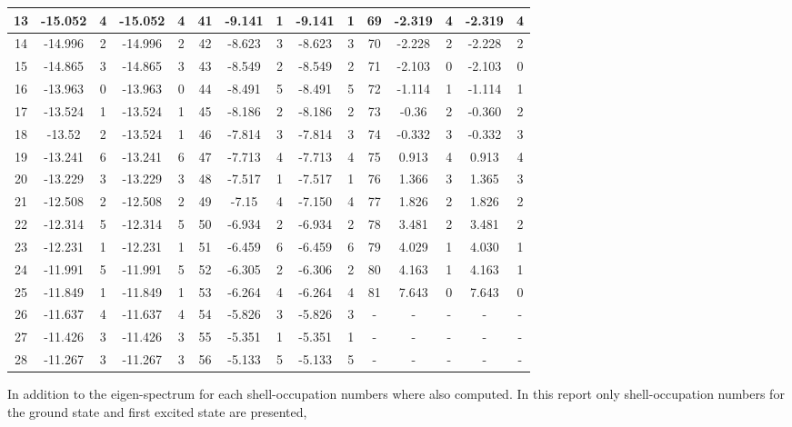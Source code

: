 \begin{table}[h]
\begin{tabular}{|c|c|c|c|c||c|c|c|c|c||c|c|c|c|c|}
\hline 13  & -15.052 &       4 & -15.052 & 4 & 41  &  -9.141 &       1 & -9.141 & 1 & 69  &  -2.319 &       4 & -2.319 & 4 \\
\hline 14  & -14.996 &       2 & -14.996 & 2 & 42  &  -8.623 &       3 & -8.623 & 3 & 70  &  -2.228 &       2 & -2.228 & 2 \\
\hline 15  & -14.865 &       3 & -14.865 & 3 & 43  &  -8.549 &       2 & -8.549 & 2 & 71  &  -2.103 &       0 & -2.103 & 0 \\
\hline 16  & -13.963 &       0 & -13.963 & 0 & 44  &  -8.491 &       5 & -8.491 & 5 & 72  &  -1.114 &       1 & -1.114 & 1 \\
\hline 17  & -13.524 &       1 & -13.524 & 1 & 45  &  -8.186 &       2 & -8.186 & 2 & 73  &   -0.36 &       2 & -0.360 & 2 \\
\hline 18  &  -13.52 &       2 & -13.524 & 1 & 46  &  -7.814 &       3 & -7.814 & 3 & 74  &  -0.332 &       3 & -0.332 & 3 \\
\hline 19  & -13.241 &       6 & -13.241 & 6 & 47  &  -7.713 &       4 & -7.713 & 4 & 75  &   0.913 &       4 & 0.913 & 4 \\
\hline 20  & -13.229 &       3 & -13.229 & 3 & 48  &  -7.517 &       1 & -7.517 & 1 & 76  &   1.366 &       3 & 1.365 & 3 \\
\hline 21  & -12.508 &       2 & -12.508 & 2 & 49  &   -7.15 &       4 & -7.150 & 4 & 77  &   1.826 &       2 & 1.826 & 2 \\
\hline 22  & -12.314 &       5 & -12.314 & 5 & 50  &  -6.934 &       2 & -6.934 & 2 & 78  &   3.481 &       2 & 3.481 & 2 \\
\hline 23  & -12.231 &       1 & -12.231 & 1 & 51  &  -6.459 &       6 & -6.459 & 6 & 79  &   4.029 &       1 & 4.030 & 1 \\
\hline 24  & -11.991 &       5 & -11.991 & 5 & 52  &  -6.305 &       2 & -6.306 & 2 & 80  &   4.163 &       1 & 4.163 & 1 \\
\hline 25  & -11.849 &       1 & -11.849 & 1 & 53  &  -6.264 &       4 & -6.264 & 4 & 81  &   7.643 &       0 & 7.643 & 0 \\
\hline 26  & -11.637 &       4 & -11.637 & 4 & 54  &  -5.826 &       3 & -5.826 & 3 &  -  &  -  &  -  &  -  &  -  \\
\hline 27  & -11.426 &       3 & -11.426 & 3 & 55  &  -5.351 &       1 & -5.351 & 1 &  -  &  -  &  -  &  -  &  -  \\
\hline 28  & -11.267 &       3 & -11.267 & 3 & 56  &  -5.133 &       5 & -5.133 & 5 &  -  &  -  &  -  &  -  &  -  \\
\hline
\end{tabular}
\end{table}

In addition to the eigen-spectrum for each shell-occupation numbers where also computed. In this report only shell-occupation numbers for the ground state and first excited state are presented, 

